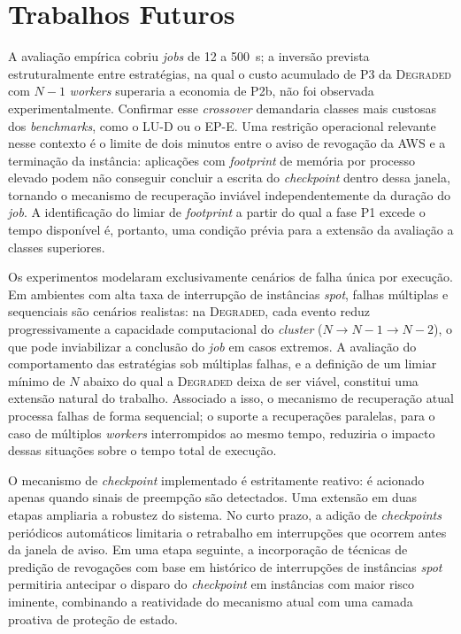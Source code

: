 \section{Trabalhos Futuros}
\label{sec:trabalhos-futuros}

A avaliação empírica cobriu \textit{jobs} de 12 a 500~s; a inversão prevista
estruturalmente entre estratégias, na qual o custo acumulado de P3 da \textsc{Degraded}
com $N{-}1$ \textit{workers} superaria a economia de P2b, não foi observada
experimentalmente. Confirmar esse \textit{crossover} demandaria classes mais custosas
dos \textit{benchmarks}, como o LU-D ou o EP-E. Uma restrição operacional relevante
nesse contexto é o limite de dois minutos entre o aviso de revogação da AWS e a
terminação da instância: aplicações com \textit{footprint} de memória por processo
elevado podem não conseguir concluir a escrita do \textit{checkpoint} dentro dessa
janela, tornando o mecanismo de recuperação inviável independentemente da duração do
\textit{job}. A identificação do limiar de \textit{footprint} a partir do qual a fase
P1 excede o tempo disponível é, portanto, uma condição prévia para a extensão da
avaliação a classes superiores.

Os experimentos modelaram exclusivamente cenários de falha única por execução. Em
ambientes com alta taxa de interrupção de instâncias \textit{spot}, falhas múltiplas e
sequenciais são cenários realistas: na \textsc{Degraded}, cada evento reduz
progressivamente a capacidade computacional do \textit{cluster}
($N \rightarrow N\!-\!1 \rightarrow N\!-\!2$), o que pode inviabilizar a conclusão do
\textit{job} em casos extremos. A avaliação do comportamento das estratégias sob
múltiplas falhas, e a definição de um limiar mínimo de $N$ abaixo do qual a
\textsc{Degraded} deixa de ser viável, constitui uma extensão natural do trabalho.
Associado a isso, o mecanismo de recuperação atual processa falhas de forma sequencial;
o suporte a recuperações paralelas, para o caso de múltiplos \textit{workers}
interrompidos ao mesmo tempo, reduziria o impacto dessas situações sobre o tempo total
de execução.

O mecanismo de \textit{checkpoint} implementado é estritamente reativo: é acionado
apenas quando sinais de preempção são detectados. Uma extensão em duas etapas ampliaria
a robustez do sistema. No curto prazo, a adição de \textit{checkpoints} periódicos
automáticos limitaria o retrabalho em interrupções que ocorrem antes da janela de aviso.
Em uma etapa seguinte, a incorporação de técnicas de predição de revogações com base em
histórico de interrupções de instâncias \textit{spot} permitiria antecipar o disparo do
\textit{checkpoint} em instâncias com maior risco iminente, combinando a reatividade do
mecanismo atual com uma camada proativa de proteção de estado.

